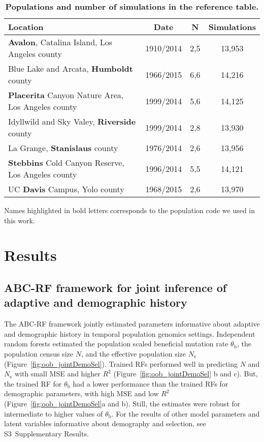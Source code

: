 \documentclass[a4paper, 12pt]{article}
\begin{document}
\begin{table}[!ht]
 \caption{\textbf{Populations and number of simulations in the reference table.}}
  \centering
  \begin{tabular}{lccc}
   \cmidrule(r){1-4}
    Location                                                  &Date      &N   &Simulations \\
    \midrule               
    \textbf{Avalon}, Catalina Island, Los Angeles county      &1910/2014 &2,5 &13,953      \\ 
    Blue Lake and Arcata, \textbf{Humboldt} county            &1966/2015 &6,6 &14,216      \\ 
    \textbf{Placerita} Canyon Nature Area, Los Angeles county &1999/2014 &5,6 &14,125      \\ 
    Idyllwild and Sky Valey, \textbf{Riverside} county        &1999/2014 &2,8 &13,930      \\ 
    La Grange, \textbf{Stanislaus} county                     &1976/2014 &2,6 &13,956      \\ 
    \textbf{Stebbins} Cold Canyon Reserve, Los Angeles county &1996/2014 &5,5 &14,121      \\ 
    UC \textbf{Davis} Campus, Yolo county                     &1968/2015 &2,6 &13,970      \\ 
    \bottomrule
  \end{tabular}
  \begin{tablenotes}
      \small
      \item Names highlighted in bold letters corresponds to the population code we used in this work.
  
  \end{tablenotes}
  \label{tab:feralbees}
\end{table}

\section*{Results}

\subsection*{ABC-RF framework for joint inference of adaptive and demographic history}

The ABC-RF framework jointly estimated parameters informative about adaptive and demographic history in temporal population genomics settings. Independent random forests estimated the population scaled beneficial mutation rate $\theta_\mathrm{b}$, the population census size $N$, and the effective population size $N_{\mathrm{e}}$ (Figure~\ref{fig:oob_jointDemoSel}). Trained RFs performed well in predicting $N$ and $N_{\mathrm{e}}$ with small MSE and higher $R^2$ (Figure~\ref{fig:oob_jointDemoSel} b and c). But, the trained RF for  $\theta_\mathrm{b}$ had a lower performance than the trained RFs for demographic parameters, with high MSE and low $R^2$ (Figure~\ref{fig:oob_jointDemoSel}a and b). Still, the estimates were robust for intermediate to higher values of $\theta_\mathrm{b}$. For the results of other model parameters and latent variables informative about demography and selection, see S3~Supplementary Results. 
\end{document}
